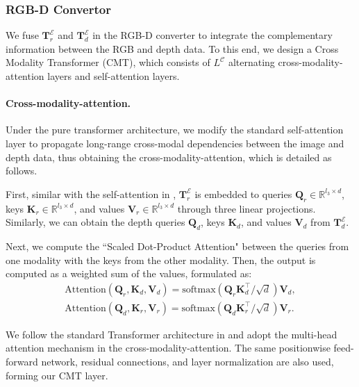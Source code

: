 \documentclass[10pt,twocolumn,letterpaper]{article}
\begin{document}
\subsubsection{RGB-D Convertor}
We fuse $\bm{T}_r^{\mathcal{E}}$ and $\bm{T}_d^{\mathcal{E}}$ in the RGB-D converter to integrate the complementary information between the RGB and depth data.
To this end, we design a Cross Modality Transformer (CMT), which consists of $L^{\mathcal{C}}$ alternating cross-modality-attention layers and self-attention layers.

\vspace{-3mm}
\paragraph{Cross-modality-attention.}
Under the pure transformer architecture, we modify the standard self-attention layer to propagate long-range cross-modal dependencies between the image and depth data, thus obtaining the cross-modality-attention, which is detailed as follows.

First, similar with the self-attention in \cite{vaswani2017attention}, $\bm{T}_r^{\mathcal{E}}$ is embedded to queries $\bm{Q}_r \in {\mathbb{R}^{l_3\times d}}$, keys $\bm{K}_r \in {\mathbb{R}^{l_3\times d}}$, and values $\bm{V}_r \in {\mathbb{R}^{l_3\times d}}$ through three linear projections.
Similarly, we can obtain the depth queries $\bm{Q}_d$, keys $\bm{K}_d$, and values $\bm{V}_d$ from $\bm{T}_d^{\mathcal{E}}$.

Next, we compute the ``Scaled Dot-Product Attention" \cite{vaswani2017attention} between the queries from one modality with the keys from the other modality. Then, the output is computed as a weighted sum of the values, formulated as:
\begin{equation} \label{cross-at}
\begin{split}
\text{Attention}(\bm{Q}_r, \bm{K}_d, \bm{V}_d) = \text{softmax}(\bm{Q}_r\bm{K}_d^{\top} / \sqrt{d})\bm{V}_d, \\
\text{Attention}(\bm{Q}_d, \bm{K}_r, \bm{V}_r) = \text{softmax}(\bm{Q}_d\bm{K}_r^{\top} / \sqrt{d})\bm{V}_r.
\end{split}
\end{equation}

We follow the standard Transformer architecture in \cite{vaswani2017attention} and adopt the multi-head attention mechanism in the cross-modality-attention. The same positionwise feed-forward network, residual connections, and layer normalization \cite{ba2016layer} are also used, forming our CMT layer.
\end{document}
